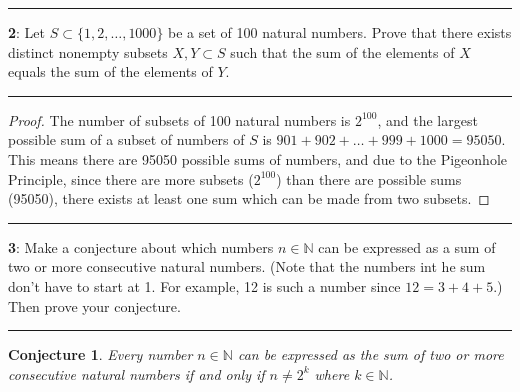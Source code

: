 \documentclass[11pt]{article}
\newcommand\question[2]{\vspace{.25in}\hrule\textbf{#1}: #2\vspace{.5em}\hrule\vspace{.10in}}
\newcommand{\N}{\mathbb{N}}
\newtheorem{conjecture}[theorem]{Conjecture }
\begin{document}
\question{2}{Let $S\subset\{1,2,\ldots,1000\}$ be a set of 100 natural numbers. Prove that there exists distinct nonempty subsets $X,Y \subset S$ such that the sum of the elements of $X$ equals the sum of the elements of $Y$.}

\begin{proof}
	The number of subsets of 100 natural numbers is $2^{100}$, and the largest possible sum of a subset of numbers of $S$ is $901 + 902 + \ldots + 999 + 1000 = 95050$. This means there are 95050 possible sums of numbers, and due to the Pigeonhole Principle, since there are more subsets ($2^{100}$) than there are possible sums (95050), there exists at least one sum which can be made from two subsets. 
\end{proof}


\question{3}{Make a conjecture about which numbers $n \in \N$ can be expressed as a sum of two or more consecutive natural numbers. (Note that the numbers int he sum don't have to start at 1. For example, 12 is such a number since $12 = 3 + 4 + 5$.) Then prove your conjecture.}

\begin{conjecture}
	Every number $n \in \N$ can be expressed as the sum of two or more consecutive natural numbers if and only if $n \ne 2^k$ where $k \in \N$.
\end{conjecture}
\end{document}
